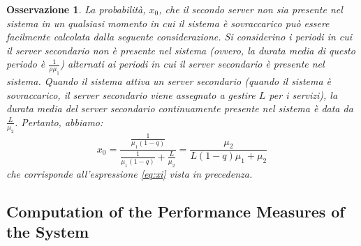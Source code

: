 \documentclass[11pt]{article}
\newtheorem{osservazione}[teorema]{Osservazione}
\begin{document}
\begin{osservazione}
    La probabilità, $x_0$, che il secondo server non sia presente nel sistema in un qualsiasi momento in cui il sistema è sovraccarico può essere facilmente calcolata dalla seguente considerazione. Si considerino i periodi in cui il server secondario non è presente nel sistema (ovvero, la durata media di questo periodo è $\frac{1}{\rho \mu_1}$) alternati ai periodi in cui il server secondario è presente nel sistema. Quando il sistema attiva un server secondario (quando il sistema è sovraccarico, il server secondario viene assegnato a gestire $L$ per i servizi), la durata media del server secondario continuamente presente nel sistema è data da $\frac{L}{\mu_2}$. Pertanto, abbiamo:
    \begin{equation}
        x_0  = \frac{\frac{1}{\mu_1(1-q)}}{\frac{1}{\mu_1(1-q)} + \frac{L}{\mu_2}} = \frac{\mu_2}{L(1-q)\mu_1 + \mu_2}
    \end{equation}
    che corrisponde all'espressione \ref{eq:xi} vista in precedenza.
\end{osservazione}

\subsection{Computation of the Performance Measures of the System}
\end{document}
